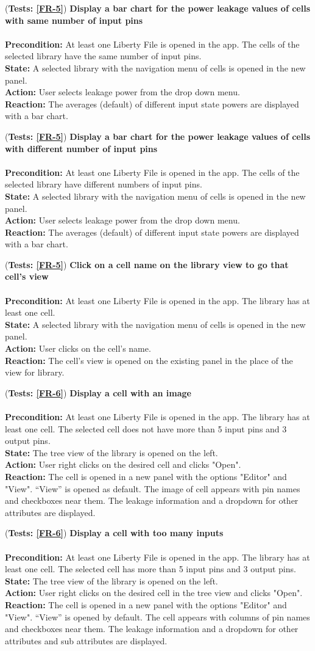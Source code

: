 \documentclass[10pt,a4paper]{report}
\newcommand{\precondition}[1]{
    \textbf{Precondition: } #1 \leavevmode \\
}
\newcommand{\action}[1]{
    \textbf{Action: } #1 \leavevmode \\
}
\newcommand{\state}[1]{
    \textbf{State: } #1 \leavevmode \\
}
\newcommand{\reaction}[1]{
    \textbf{Reaction: } #1 \leavevmode \\
}
\newcommand{\GTCDescription}[2]{
    (\textbf{Tests: #1}) \textbf{#2} \leavevmode \\
}
\begin{document}
\begin{GTC}
{}
    \item \GTCDescription{\ref{FR-5}}{Display a bar chart for the power leakage values of cells with same number of input pins} \leavevmode \\ \precondition{At least one Liberty File is opened in the app. The cells of the selected library have the same number of input pins.}\state{A selected library with the navigation menu of cells is opened in the new panel.}\action{User selects leakage power from the drop down menu.}\reaction{The averages (default) of different input state powers are displayed with a bar chart. \label{GTC-10}
}
    \item \GTCDescription{\ref{FR-5}}{Display a bar chart for the power leakage values of cells with different number of input pins} \leavevmode \\ \precondition{At least one Liberty File is opened in the app. The cells of the selected library have different numbers of input pins.}\state{A selected library with the navigation menu of cells is opened in the new panel.}\action{User selects leakage power from the drop down menu.}\reaction{The averages (default) of different input state powers are displayed with a bar chart.
}
    \item \GTCDescription{\ref{FR-5}}{Click on a cell name on the library view to go that cell's view} \leavevmode \\ \precondition{At least one Liberty File is opened in the app. The library has at least one cell.}\state{A selected library with the navigation menu of cells is opened in the new panel.}\action{User clicks on the cell's name.}\reaction{The cell's view is opened on the existing panel in the place of the view for library.
}
    \item \GTCDescription{\ref{FR-6}}{Display a cell with an image} \leavevmode \\ \precondition{At least one Liberty File is opened in the app. The library has at least one cell. The selected cell does not have more than 5 input pins and 3 output pins.}\state{The tree view of the library is opened on the left.}\action{User right clicks on the desired cell and clicks "Open".}\reaction{The cell is opened in a new panel with the options "Editor" and  "View". “View” is opened as default. The image of cell appears with pin names and checkboxes near them. The leakage information and a dropdown for other attributes are displayed.
}
    \item \GTCDescription{\ref{FR-6}}{Display a cell with too many inputs} \leavevmode \\ \precondition{At least one Liberty File is opened in the app. The library has at least one cell. The selected cell has more than 5 input pins and 3 output pins.}\state{The tree view of the library is opened on the left.}\action{User right clicks on the desired cell in the tree view and clicks "Open".}\reaction{The cell is opened in a new panel with the options "Editor" and "View". “View” is opened by default. The cell appears with columns of pin names and checkboxes near them. The leakage information and a dropdown for other attributes and sub attributes are displayed.
}
\end{GTC}
\end{document}
